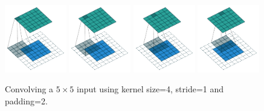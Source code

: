 \documentclass{article}
\begin{document}
\begin{figure}[H]
    \centering
    \includegraphics[width=0.24\textwidth]{pdf/arbitrary_padding_no_strides_00.pdf}
    \includegraphics[width=0.24\textwidth]{pdf/arbitrary_padding_no_strides_01.pdf}
    \includegraphics[width=0.24\textwidth]{pdf/arbitrary_padding_no_strides_02.pdf}
    \includegraphics[width=0.24\textwidth]{pdf/arbitrary_padding_no_strides_03.pdf}
    \caption{\label{fig:arbitrary_padding_no_strides} 
        Convolving a $5 \times 5$ input using kernel size=4, stride=1 and padding=2.}
\end{figure}
\end{document}
